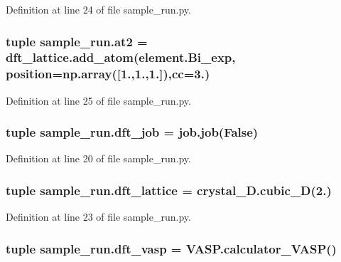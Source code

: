 Definition at line 24 of file sample\+\_\+run.\+py.

\hypertarget{namespacesample__run_a03c770a21d5144cd53671d6f80744c33}{
\subsubsection[{at2}]{\setlength{\rightskip}{0pt plus 5cm}tuple sample\+\_\+run.\+at2 = dft\+\_\+lattice.\+add\+\_\+atom(element.\+Bi\+\_\+exp, position=np.\+array(\mbox{[}1.,1.,1.\mbox{]}),cc=3.)}}\label{namespacesample__run_a03c770a21d5144cd53671d6f80744c33}


Definition at line 25 of file sample\+\_\+run.\+py.

\hypertarget{namespacesample__run_aa032765ae1aa4d996d7186fa8a379888}{
\subsubsection[{dft\+\_\+job}]{\setlength{\rightskip}{0pt plus 5cm}tuple sample\+\_\+run.\+dft\+\_\+job = job.\+job(False)}}\label{namespacesample__run_aa032765ae1aa4d996d7186fa8a379888}


Definition at line 20 of file sample\+\_\+run.\+py.

\hypertarget{namespacesample__run_a14f8592f9c3b175cd3705824d72dc516}{
\subsubsection[{dft\+\_\+lattice}]{\setlength{\rightskip}{0pt plus 5cm}tuple sample\+\_\+run.\+dft\+\_\+lattice = crystal\+\_\+D.\+cubic\+\_\+D(2.)}}\label{namespacesample__run_a14f8592f9c3b175cd3705824d72dc516}


Definition at line 23 of file sample\+\_\+run.\+py.

\hypertarget{namespacesample__run_a5d55a2760f29354033cb6b08bbf078ec}{
\subsubsection[{dft\+\_\+vasp}]{\setlength{\rightskip}{0pt plus 5cm}tuple sample\+\_\+run.\+dft\+\_\+vasp = V\+A\+S\+P.\+calculator\+\_\+\+V\+A\+S\+P()}}\label{namespacesample__run_a5d55a2760f29354033cb6b08bbf078ec}


